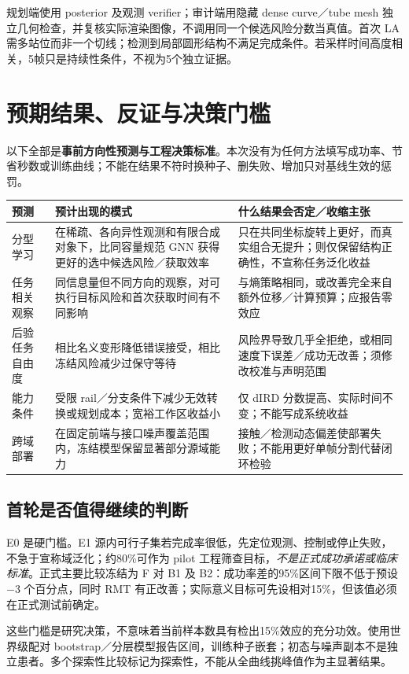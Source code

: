 \documentclass[UTF8,fontset=fandol,11pt,a4paper]{ctexart}
\theoremstyle{plain}
\theoremstyle{definition}
\theoremstyle{remark}
\numberwithin{equation}{section}
\begin{document}
规划端使用 posterior 及观测 verifier；审计端用隐藏 dense curve／tube mesh 独立几何检查，并复核实际渲染图像，不调用同一个候选风险分数当真值。首次 LA 需多站位而非一个切线；检测到局部圆形结构不满足完成条件。若采样时间高度相关，5帧只是持续性条件，不视为5个独立证据。

\section{预期结果、反证与决策门槛}
\label{sec:expectation}
\begin{scopebox}
以下全部是\textbf{事前方向性预测与工程决策标准}。本次没有为任何方法填写成功率、节省秒数或训练曲线；不能在结果不符时换种子、删失败、增加只对基线生效的惩罚。
\end{scopebox}
\begin{longtable}{P{25mm}P{58mm}P{63mm}}
\toprule 预测 & 预计出现的模式 & 什么结果会否定／收缩主张\\\midrule\endhead
分型学习 & 在稀疏、各向异性观测和有限合成对象下，比同容量规范 GNN 获得更好的选中候选风险／获取效率 & 只在共同坐标旋转上更好，而真实组合无提升；则仅保留结构正确性，不宣称任务泛化收益\\
任务相关观察 & 同信息量但不同方向的观察，对可执行目标风险和首次获取时间有不同影响 & 与熵策略相同，或改善完全来自额外位移／计算预算；应报告零效应\\
后验任务自由度 & 相比名义变形降低错误接受，相比冻结风险减少过保守等待 & 风险界导致几乎全拒绝，或相同速度下误差／成功无改善；须修改校准与声明范围\\
能力条件 & 受限 rail／分支条件下减少无效转换或规划成本；宽裕工作区收益小 & 仅 dIRD 分数提高、实际时间不变；不能写成系统收益\\
跨域部署 & 在固定前端与接口噪声覆盖范围内，冻结模型保留显著部分源域能力 & 接触／检测动态偏差使部署失败；不能用更好单帧分割代替闭环检验\\\bottomrule
\end{longtable}

\subsection{首轮是否值得继续的判断}
E0 是硬门槛。E1 源内可行子集若完成率很低，先定位观测、控制或停止失败，不急于宣称域泛化；约80\%可作为 pilot 工程筛查目标，\emph{不是正式成功承诺或临床标准}。正式主要比较冻结为 F 对 B1 及 B2：成功率差的95\%区间下限不低于预设 $-3$ 个百分点，同时 RMT 有正改善；实际意义目标可先设相对15\%，但该值必须在正式测试前确定。

这些门槛是研究决策，不意味着当前样本数具有检出15\%效应的充分功效。使用世界级配对 bootstrap／分层模型报告区间，训练种子嵌套；初态与噪声副本不是独立患者。多个探索性比较标记为探索性，不能从全曲线挑峰值作为主显著结果。
\end{document}
